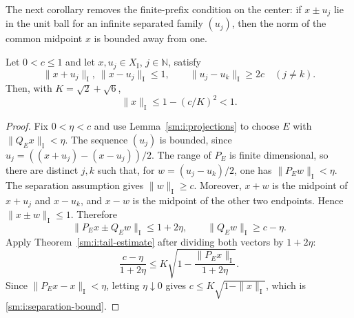 The next corollary removes the finite-prefix condition on the center:
if $x\pm u_j$ lie in the unit ball for an infinite separated family
$(u_j)$, then the norm of the common midpoint $x$ is bounded away from one.

\begin{corollary}\label{sm:i:separated-midpoints}
Let $0<c\leq1$ and let $x,u_j\in X_{\mathrm I}$, $j\in\mathbb N$,
satisfy
\[
 \|x+u_j\|_{\mathrm I},\ \|x-u_j\|_{\mathrm I}\leq1,
 \qquad \|u_j-u_k\|_{\mathrm I}\geq2c\quad(j\ne k).
\]
Then, with $K=\sqrt2+\sqrt6$,
\begin{equation}
 \|x\|_{\mathrm I}\leq1-(c/K)^2<1.
 \label{sm:i:separation-bound}
\end{equation}
\end{corollary}

\begin{proof}
Fix $0<\eta<c$ and use Lemma~\ref{sm:i:projections} to choose $E$ with
$\|Q_Ex\|_{\mathrm I}<\eta$.  The sequence $(u_j)$ is bounded, since
$u_j=((x+u_j)-(x-u_j))/2$.  The range of $P_E$ is finite dimensional,
so there are distinct $j,k$ such that, for
$w=(u_j-u_k)/2$, one has $\|P_Ew\|_{\mathrm I}<\eta$.
The separation assumption gives $\|w\|_{\mathrm I}\geq c$.
Moreover, $x+w$ is the midpoint of $x+u_j$ and $x-u_k$, and $x-w$ is
the midpoint of the other two endpoints.  Hence
$\|x\pm w\|_{\mathrm I}\leq1$.  Therefore
\[
 \|P_Ex\pm Q_Ew\|_{\mathrm I}\leq1+2\eta,
 \qquad \|Q_Ew\|_{\mathrm I}\geq c-\eta.
\]
Apply Theorem~\ref{sm:i:tail-estimate} after dividing both vectors by
$1+2\eta$:
\[
 \frac{c-\eta}{1+2\eta}
 \leq K\sqrt{1-\frac{\|P_Ex\|_{\mathrm I}}{1+2\eta}}.
\]
Since $\|P_Ex-x\|_{\mathrm I}<\eta$, letting $\eta\downarrow0$ gives
$ c\leq K\sqrt{1-\|x\|_{\mathrm I}}$, which is
\eqref{sm:i:separation-bound}.
\end{proof}

